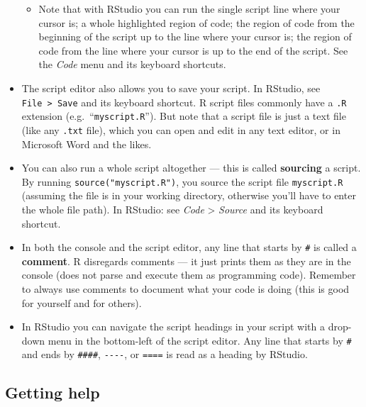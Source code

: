 \documentclass[
]{book}
\providecommand{\tightlist}{%
  \setlength{\itemsep}{0pt}\setlength{\parskip}{0pt}}
\begin{document}
\begin{itemize}
  \begin{itemize}
  \tightlist
  \item
    Note that with RStudio you can run the single script line where your cursor is; a whole highlighted region of code; the region of code from the beginning of the script up to the line where your cursor is; the region of code from the line where your cursor is up to the end of the script. See the \emph{Code} menu and its keyboard shortcuts.
  \end{itemize}
\item
  The script editor also allows you to save your script. In RStudio, see \texttt{File\ \textgreater{}\ Save} and its keyboard shortcut. R script files commonly have a \texttt{.R} extension (e.g.~``\texttt{myscript.R}''). But note that a script file is just a text file (like any \texttt{.txt} file), which you can open and edit in any text editor, or in Microsoft Word and the likes.
\item
  You can also run a whole script altogether --- this is called \textbf{sourcing} a script. By running \texttt{source("myscript.R")}, you source the script file \texttt{myscript.R} (assuming the file is in your working directory, otherwise you'll have to enter the whole file path). In RStudio: see \emph{Code} \textgreater{} \emph{Source} and its keyboard shortcut.
\item
  In both the console and the script editor, any line that starts by \texttt{\#} is called a \textbf{comment}. R disregards comments --- it just prints them as they are in the console (does not parse and execute them as programming code). Remember to always use comments to document what your code is doing (this is good for yourself and for others).
\item
  In RStudio you can navigate the script headings in your script with a drop-down menu in the bottom-left of the script editor. Any line that starts by \texttt{\#} and ends by \texttt{\#\#\#\#}, \texttt{-\/-\/-\/-}, or \texttt{====} is read as a heading by RStudio.
\end{itemize}

\hypertarget{getting-help}{%
\subsection{Getting help}\label{getting-help}}
\end{document}
